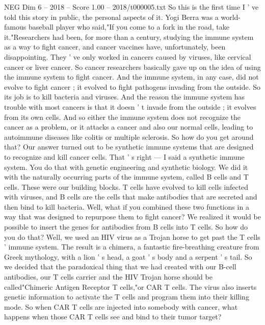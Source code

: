 \begin{textsample}{NEG Dim 6 – 2018 – Score 1.00 – 2018/t000005.txt}  \label{ex:f6_neg_018}
So this is the first time I ' ve told this story in public, the personal aspects of it.
Yogi Berra was a world-famous baseball player who said,"If you come to a fork in the road, take it."Researchers had been, for more than a century, studying the immune system as a way to fight cancer, and cancer vaccines have, unfortunately, been disappointing.
They ' ve only worked in cancers caused by viruses, like cervical cancer or liver cancer.
So cancer researchers basically gave up on the idea of using the immune system to fight cancer.
And the immune system, in any case, did not evolve to fight cancer ; it evolved to fight pathogens invading from the outside.
So its job is to kill bacteria and viruses.
And the reason the immune system has trouble with most cancers is that it doesn ' t invade from the outside ; it evolves from its own cells.
And so either the immune system does not recognize the cancer as a problem, or it attacks a cancer and also our normal cells, leading to autoimmune diseases like colitis or multiple sclerosis.
So how do you get around that?
Our answer turned out to be synthetic immune systems that are designed to recognize and kill cancer cells.
That ' s right — I said a synthetic immune system.
You do that with genetic engineering and synthetic biology.
We did it with the naturally occurring parts of the immune system, called B cells and T cells.
These were our building blocks.
T cells have evolved to kill cells infected with viruses, and B cells are the cells that make antibodies that are secreted and then bind to kill bacteria.
Well, what if you combined these two functions in a way that was designed to repurpose them to fight cancer?
We realized it would be possible to insert the genes for antibodies from B cells into T cells.
So how do you do that?
Well, we used an HIV virus as a Trojan horse to get past the T cells ' immune system.
The result is a chimera, a fantastic fire-breathing creature from Greek mythology, with a lion ' s head, a goat ' s body and a serpent ' s tail.
So we decided that the paradoxical thing that we had created with our B-cell antibodies, our T cells carrier and the HIV Trojan horse should be called"Chimeric Antigen Receptor T cells,"or CAR T cells.
The virus also inserts genetic information to activate the T cells and program them into their killing mode.
So when CAR T cells are injected into somebody with cancer, what happens when those CAR T cells see and bind to their tumor target?

\end{textsample}
